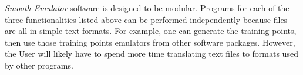 \documentclass[12pt]{article}
\numberwithin{equation}{section}
\numberwithin{figure}{section}
\begin{document}
{\it Smooth Emulator} software is designed to be modular. Programs for each of the three functionalities listed above can be performed independently because files are all in simple text formats. For example, one can generate the training points, then use those training points emulators from other software packages. However, the User will likely have to spend more time translating text files to formats used by other programs. 

\end{document}

